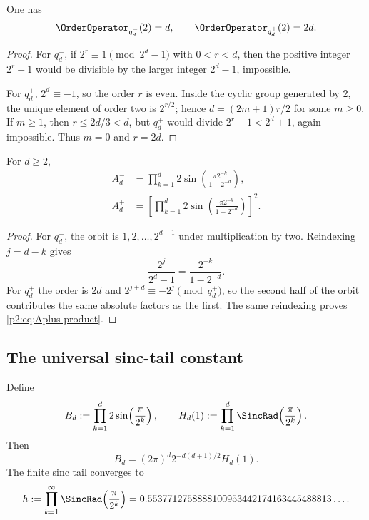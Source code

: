 \documentclass[11pt,oneside]{article}
\theoremstyle{definition}
\theoremstyle{remark}
\begin{document}
\begin{lemma}\label{p2:lem:orders-pm}
One has
\begin{equation}
 \OrderOperator_{q_d^-}(2)=d,
 \qquad
 \OrderOperator_{q_d^+}(2)=2d.
 \label{p2:eq:orders-pm}
\end{equation}
\end{lemma}

\begin{proof}
For $q_d^-$, if $2^r\equiv1\pmod{2^d-1}$ with $0<r<d$, then the positive integer
$2^r-1$ would be divisible by the larger integer $2^d-1$, impossible.

For $q_d^+$, $2^d\equiv-1$, so the order $r$ is even. Inside the cyclic group
generated by $2$, the unique element of order two is $2^{r/2}$; hence
$d=(2m+1)r/2$ for some $m\ge0$. If $m\ge1$, then $r\le2d/3<d$, but
$q_d^+$ would divide $2^r-1<2^d+1$, again impossible. Thus $m=0$ and $r=2d$.
\end{proof}

\begin{proposition}\label{p2:prop:pm-products}
For $d\ge2$,
\begin{align}
 A_d^-&=\prod_{k=1}^{d}
 2\sin\!\left(\frac{\pi2^{-k}}{1-2^{-d}}\right),
 \label{p2:eq:Aminus-product}\\
 A_d^+&=\left[
 \prod_{k=1}^{d}
 2\sin\!\left(\frac{\pi2^{-k}}{1+2^{-d}}\right)
 \right]^2.
 \label{p2:eq:Aplus-product}
\end{align}
\end{proposition}

\begin{proof}
For $q_d^-$, the orbit is $1,2,\ldots,2^{d-1}$ under multiplication by two.
Reindexing $j=d-k$ gives
\[
 \frac{2^j}{2^d-1}=\frac{2^{-k}}{1-2^{-d}}.
\]
For $q_d^+$ the order is $2d$ and $2^{j+d}\equiv-2^j\pmod{q_d^+}$, so the
second half of the orbit contributes the same absolute factors as the first.
The same reindexing proves \eqref{p2:eq:Aplus-product}.
\end{proof}

\subsection{The universal sinc-tail constant}

Define
\begin{equation}
 B_d:=\prod_{k=1}^{d}2\sin\!\left(\frac{\pi}{2^k}\right),
 \qquad
 H_d(1):=\prod_{k=1}^{d}\SincRad\!\left(\frac{\pi}{2^k}\right).
 \label{p2:eq:B-Hd}
\end{equation}
Then
\begin{equation}
 B_d=(2\pi)^d2^{-d(d+1)/2}H_d(1).
 \label{p2:eq:B-factor}
\end{equation}
The finite sinc tail converges to
\begin{equation}
 h:=\prod_{k=1}^{\infty}\SincRad\!\left(\frac{\pi}{2^k}\right)
 =0.5537712758888100953442174163445488813\ldots.
 \label{p2:eq:h-def}
\end{equation}
\end{document}

